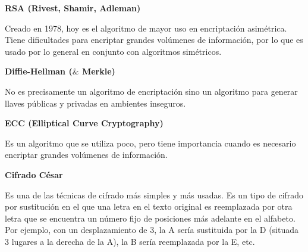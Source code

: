 \documentclass[12pt]{article}
\begin{document}
\vspace{\baselineskip}
\begin{justify}
\textbf{RSA (Rivest, Shamir, Adleman)}
\end{justify}\par


\vspace{\baselineskip}
\begin{justify}
Creado en 1978, hoy es el algoritmo de mayor uso en encriptación asimétrica. Tiene dificultades para encriptar grandes volúmenes de información, por lo que es usado por lo general en conjunto con algoritmos simétricos.
\end{justify}\par


\vspace{\baselineskip}
\begin{justify}
\textbf{Diffie-Hellman ($\&$  Merkle)}
\end{justify}\par


\vspace{\baselineskip}
\begin{justify}
No es precisamente un algoritmo de encriptación sino un algoritmo para generar llaves públicas y privadas en ambientes inseguros.
\end{justify}\par


\vspace{\baselineskip}
\begin{justify}
\textbf{ECC (Elliptical Curve Cryptography)}
\end{justify}\par


\vspace{\baselineskip}
\begin{justify}
Es un algoritmo que se utiliza poco, pero tiene importancia cuando es necesario encriptar grandes volúmenes de información.
\end{justify}\par


\vspace{\baselineskip}
\begin{justify}
\textbf{Cifrado César}
\end{justify}\par


\vspace{\baselineskip}
\begin{justify}
Es una de las técnicas de cifrado más simples y más usadas. Es un tipo de cifrado por sustitución en el que una letra en el texto original es reemplazada por otra letra que se encuentra un número fijo de posiciones más adelante en el alfabeto. Por ejemplo, con un desplazamiento de 3, la A sería sustituida por la D (situada 3 lugares a la derecha de la A), la B sería reemplazada por la E, etc.
\end{justify}\par
\end{document}
